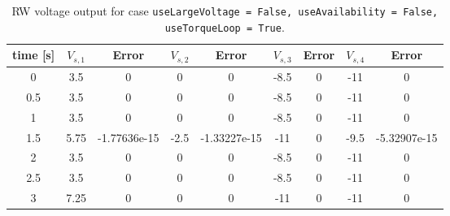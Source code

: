 \begin{table}[htbp]\caption{RW voltage output for case {\tt useLargeVoltage = False, useAvailability = False, useTorqueLoop = True}.}\label{tbl:testFalseFalseTrue}\centering\begin{tabular}{ccccccccc}
\hline
  time [s]  &  $V_{s,1}$  &    Error     &  $V_{s,2}$  &    Error     &  $V_{s,3}$  &  Error  &  $V_{s,4}$  &    Error     \\
\hline
     0      &     3.5     &      0       &      0      &      0       &    -8.5     &    0    &     -11     &      0       \\
    0.5     &     3.5     &      0       &      0      &      0       &    -8.5     &    0    &     -11     &      0       \\
     1      &     3.5     &      0       &      0      &      0       &    -8.5     &    0    &     -11     &      0       \\
    1.5     &    5.75     & -1.77636e-15 &    -2.5     & -1.33227e-15 &     -11     &    0    &    -9.5     & -5.32907e-15 \\
     2      &     3.5     &      0       &      0      &      0       &    -8.5     &    0    &     -11     &      0       \\
    2.5     &     3.5     &      0       &      0      &      0       &    -8.5     &    0    &     -11     &      0       \\
     3      &    7.25     &      0       &      0      &      0       &     -11     &    0    &     -11     &      0       \\
\hline\end{tabular}\end{table}